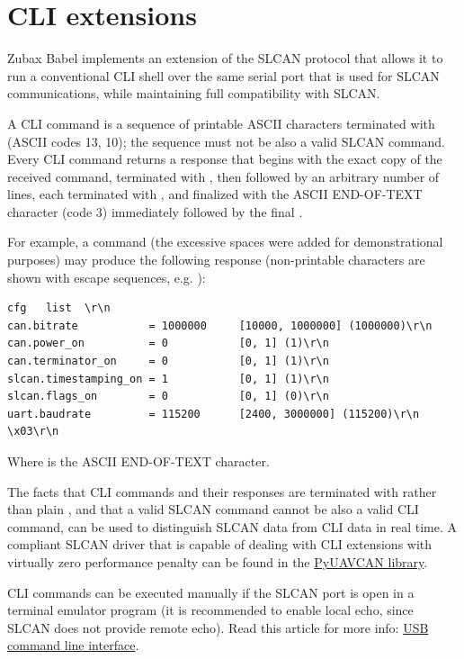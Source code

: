 \documentclass{zubaxdoc}
\begin{document}
\section{CLI extensions}

Zubax Babel implements an extension of the SLCAN protocol that allows it to run a conventional CLI shell over the same serial port that is used for SLCAN communications, while maintaining full compatibility with SLCAN.

A CLI command is a sequence of printable ASCII characters terminated with  (ASCII codes 13, 10); the sequence must not be also a valid SLCAN command. Every CLI command returns a response that begins with the exact copy of the received command, terminated with , then followed by an arbitrary number of lines, each terminated with , and finalized with the ASCII END-OF-TEXT character (code 3) immediately followed by the final .

For example, a command  (the excessive spaces were added for demonstrational purposes) may produce the following response (non-printable characters are shown with escape sequences, e.g. ):

\begin{verbatim}
cfg   list  \r\n
can.bitrate           = 1000000     [10000, 1000000] (1000000)\r\n
can.power_on          = 0           [0, 1] (1)\r\n
can.terminator_on     = 0           [0, 1] (1)\r\n
slcan.timestamping_on = 1           [0, 1] (1)\r\n
slcan.flags_on        = 0           [0, 1] (0)\r\n
uart.baudrate         = 115200      [2400, 3000000] (115200)\r\n
\x03\r\n
\end{verbatim}

Where  is the ASCII END-OF-TEXT character.

The facts that CLI commands and their responses are terminated with  rather than plain , and that a valid SLCAN command cannot be also a valid CLI command, can be used to distinguish SLCAN data from CLI data in real time. A compliant SLCAN driver that is capable of dealing with CLI extensions with virtually zero performance penalty can be found in the \href{http://uavcan.org/Implementations/Pyuavcan/}{PyUAVCAN library}.

CLI commands can be executed manually if the SLCAN port is open in a terminal emulator program (it is recommended to enable local echo, since SLCAN does not provide remote echo). Read this article for more info: \href{https://docs.zubax.com/usb}{USB command line interface}.
\clearpage
\end{document}

